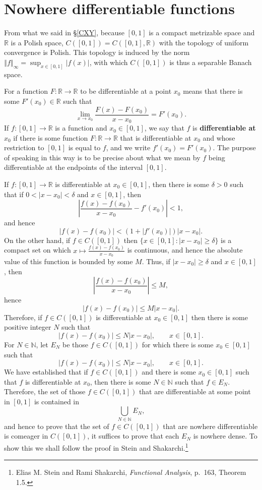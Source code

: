 \documentclass{article}
\newcommand{\norm}[1]{\left\Vert #1 \right\Vert}
\theoremstyle{definition}
\theoremstyle{definition}
\begin{document}
\section{Nowhere differentiable functions}
From what we said in \S \ref{CXY},
because $[0,1]$ is a compact metrizable space and $\mathbb{R}$ is a Polish space, $C([0,1])=
C([0,1],\mathbb{R})$ with the topology of uniform convergence is Polish. This topology is induced by the norm $\norm{f}_\infty = \sup_{x \in [0,1]} |f(x)|$,
with which $C([0,1])$ is thus a separable Banach space.

For a function $F:\mathbb{R} \to \mathbb{R}$ to be differentiable at a point $x_0$ means that
there is some $F'(x_0) \in \mathbb{R}$ such that
\[
\lim_{x \to x_0} \frac{F(x)-F(x_0)}{x-x_0} = F'(x_0).
\]
If $f:[0,1] \to \mathbb{R}$ is a function and $x_0 \in [0,1]$, we say that $f$ is \textbf{differentiable at $x_0$} if there is some function $F:\mathbb{R} \to \mathbb{R}$ that
is differentiable at $x_0$ and whose restriction to $[0,1]$ is equal to $f$, and we write $f'(x_0)=F'(x_0)$. The purpose of speaking in this way 
is to be precise about what we mean by $f$ being differentiable at the endpoints of the interval $[0,1]$. 

If $f:[0,1] \to \mathbb{R}$ is differentiable at $x_0 \in [0,1]$, then there is some $\delta>0$ such that if $0<|x-x_0| < \delta$ and $x \in [0,1]$, then
\[
\left|\frac{f(x)-f(x_0)}{x-x_0} - f'(x_0)\right|<1,
\]
and hence
\[
|f(x)-f(x_0)|< (1+|f'(x_0)|)|x-x_0|.
\]
On the other hand, if $f \in C([0,1])$ then $\{x \in [0,1]: |x-x_0| \geq \delta\}$ is a compact set on which $x \mapsto \frac{f(x)-f(x_0)}{x-x_0}$ is continuous, and hence the absolute value of this
function is bounded
by some $M$. Thus, if $|x-x_0| \geq \delta$ and $x \in [0,1]$, then
\[
\left|\frac{f(x)-f(x_0)}{x-x_0} \right| \leq M,
\]
hence
\[
|f(x)-f(x_0)| \leq M|x-x_0|.
\]
Therefore, if $f \in C([0,1])$ is differentiable at $x_0 \in [0,1]$ then there is some positive integer $N$ such that
\[
|f(x)-f(x_0)| \leq N|x-x_0|, \qquad x \in [0,1].
\]
For $N \in \mathbb{N}$, let $E_N$ be those $f \in C([0,1])$ for which there is some $x_0 \in [0,1]$ such that
\[
|f(x)-f(x_0)| \leq N|x-x_0|, \qquad x \in [0,1].
\]
We have established that if $f \in C([0,1])$ and there is some $x_0 \in [0,1]$ such that $f$ is differentiable at $x_0$, then
there is some $N \in \mathbb{N}$ such that $f \in E_N$. 
Therefore, the set of those $f \in C([0,1])$ that are differentiable at some point in $[0,1]$ is contained in 
\[
\bigcup_{N \in \mathbb{N}} E_N,
\]
and hence to prove that the set of $f \in C([0,1])$ that are nowhere differentiable is comeager in $C([0,1])$, it suffices to prove
that each $E_N$ is nowhere dense.
To show this we shall follow the proof in Stein and Shakarchi.\footnote{Elias M. Stein and Rami Shakarchi, {\em Functional Analysis}, p.~163, Theorem 1.5.} 
\end{document}
